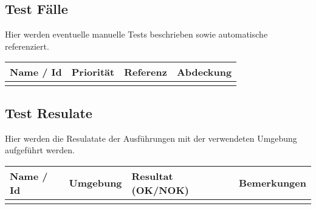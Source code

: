 \subsection{Test Fälle}
Hier werden eventuelle manuelle Tests beschrieben sowie automatische referenziert. 

\begin{center}
	\begin{tabular}{ | l | l | l | l | }
	\hline
	Name / Id & Priorität & Referenz & Abdeckung \\
	\hline
	 & & & \\
	\hline
	\end{tabular}
\end{center}

\subsection{Test Resulate}
Hier werden die Resulatate der Ausführungen mit der verwendeten Umgebung aufgeführt werden.

\begin{center}
	\begin{tabular}{ | l | l | l | l | }
	\hline
	Name / Id & Umgebung & Resultat (OK/NOK) & Bemerkungen \\
	\hline
	 & & & \\
	\hline
	\end{tabular}
\end{center}



